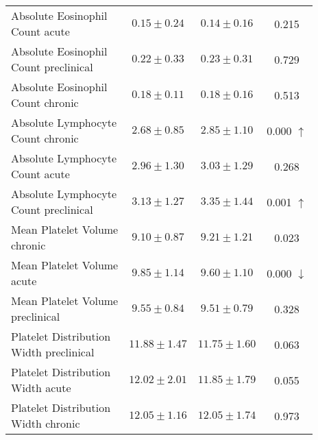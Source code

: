 \begin{table}[htbp]
\begin{tabular}{lccc}
\makecell[l]{Absolute Eosinophil \\ Count acute} & $0.15 \pm 0.24$ & $0.14 \pm 0.16$ & 0.215  \\

\makecell[l]{Absolute Eosinophil \\ Count preclinical} & $0.22 \pm 0.33$ & $0.23 \pm 0.31$ & 0.729  \\

\makecell[l]{Absolute Eosinophil \\ Count chronic} & $0.18 \pm 0.11$ & $0.18 \pm 0.16$ & 0.513  \\

\makecell[l]{Absolute Lymphocyte \\ Count chronic} & $2.68 \pm 0.85$ & $2.85 \pm 1.10$ & 0.000 $\uparrow$ \\

\makecell[l]{Absolute Lymphocyte \\ Count acute} & $2.96 \pm 1.30$ & $3.03 \pm 1.29$ & 0.268  \\

\makecell[l]{Absolute Lymphocyte \\ Count preclinical} & $3.13 \pm 1.27$ & $3.35 \pm 1.44$ & 0.001 $\uparrow$ \\

\makecell[l]{Mean Platelet Volume \\ chronic} & $9.10 \pm 0.87$ & $9.21 \pm 1.21$ & 0.023  \\

\makecell[l]{Mean Platelet Volume \\ acute} & $9.85 \pm 1.14$ & $9.60 \pm 1.10$ & 0.000 $\downarrow$ \\

\makecell[l]{Mean Platelet Volume \\ preclinical} & $9.55 \pm 0.84$ & $9.51 \pm 0.79$ & 0.328  \\

\makecell[l]{Platelet Distribution \\ Width preclinical} & $11.88 \pm 1.47$ & $11.75 \pm 1.60$ & 0.063  \\

\makecell[l]{Platelet Distribution \\ Width acute} & $12.02 \pm 2.01$ & $11.85 \pm 1.79$ & 0.055  \\

\makecell[l]{Platelet Distribution \\ Width chronic} & $12.05 \pm 1.16$ & $12.05 \pm 1.74$ & 0.973  \\


\end{tabular}
\end{table}
